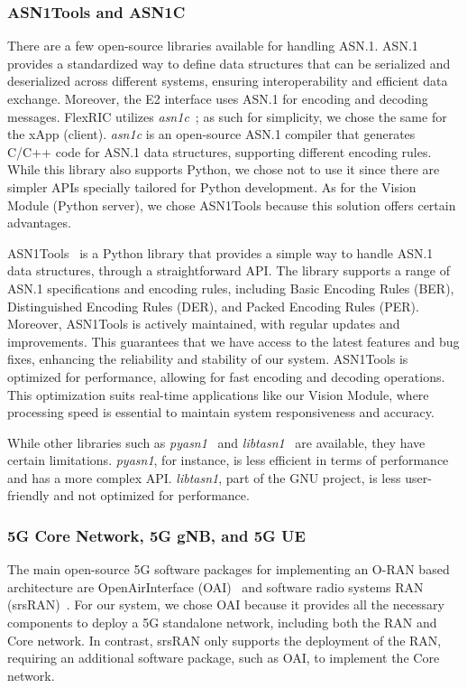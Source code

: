 \subsubsection{ASN1Tools and ASN1C}
There are a few open-source libraries available for handling ASN.1.
ASN.1 provides a standardized way to define data structures that can be serialized and deserialized across different systems, ensuring interoperability and efficient data exchange.
Moreover, the E2 interface uses ASN.1 for encoding and decoding messages.
FlexRIC utilizes \emph{asn1c}~\cite{asn1c}; as such for simplicity, we chose the same for the xApp (client).
\emph{asn1c} is an open-source ASN.1 compiler that generates C/C++ code for ASN.1 data structures, supporting different encoding rules.
While this library also supports Python, we chose not to use it since there are simpler APIs specially tailored for Python development.
As for the Vision Module (Python server), we chose ASN1Tools because this solution offers certain advantages.

ASN1Tools~\cite{asn1tools} is a Python library that provides a simple way to handle ASN.1 data structures, through a straightforward API\@.
The library supports a range of ASN.1 specifications and encoding rules, including Basic Encoding Rules (BER), Distinguished Encoding Rules (DER), and Packed Encoding Rules (PER)\@.
Moreover, ASN1Tools is actively maintained, with regular updates and improvements.
This guarantees that we have access to the latest features and bug fixes, enhancing the reliability and stability of our system.
ASN1Tools is optimized for performance, allowing for fast encoding and decoding operations.
This optimization suits real-time applications like our Vision Module, where processing speed is essential to maintain system responsiveness and accuracy.

While other libraries such as \emph{pyasn1}~\cite{pyasn1} and \emph{libtasn1}~\cite{libtasn1} are available, they have certain limitations.
\emph{pyasn1}, for instance, is less efficient in terms of performance and has a more complex API\@.
\emph{libtasn1}, part of the GNU project, is less user-friendly and not optimized for performance.


\subsubsection{5G Core Network, 5G gNB, and 5G UE}
The main open-source 5G software packages for implementing an O-RAN based architecture are OpenAirInterface (OAI)~\cite{openairinterface} and software radio systems RAN (srsRAN)~\cite{srslte}.
For our system, we chose OAI because it provides all the necessary components to deploy a 5G standalone network, including both the RAN and Core network.
In contrast, srsRAN only supports the deployment of the RAN, requiring an additional software package, such as OAI, to implement the Core network.

